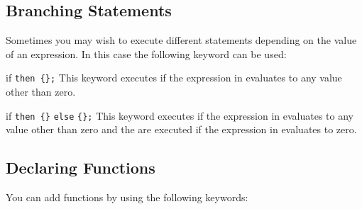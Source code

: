 \subsection{Branching Statements}

Sometimes you may wish to execute different statements depending on the value
of an expression. In this case the following keyword can be used:

\begin{math-keyword}{{if}  \texttt{then \{}\texttt{\};}}
    This keyword executes  if the expression in
     evaluates to any value other than zero.
\end{math-keyword}

\begin{math-keyword}{{if}  \texttt{then \{}\texttt{\}} \texttt{else} \texttt{\{}\texttt{\}}\texttt{;}}
    This keyword executes  if the expression in
     evaluates to any value other than zero and the
     are executed if the expression in
     evaluates to zero.
\begin{codeexample}[]
\end{codeexample}
\end{math-keyword}


\subsection{Declaring Functions}

You can add functions by using the following keywords:

